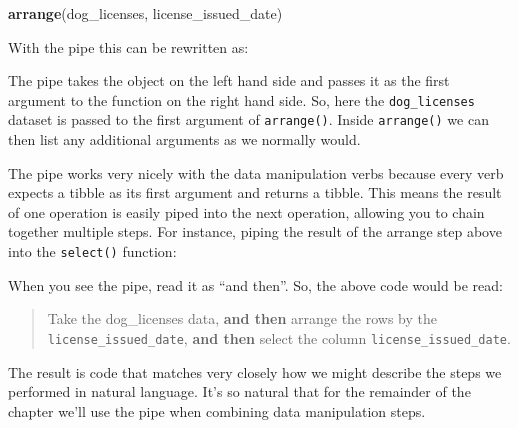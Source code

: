 \documentclass[]{Nemilov}
\newenvironment{Shaded}{\begin{snugshade}}{\end{snugshade}}
\newcommand{\KeywordTok}[1]{\textcolor[rgb]{0.13,0.29,0.53}{\textbf{#1}}}
\newcommand{\NormalTok}[1]{#1}
\newcommand{\OperatorTok}[1]{\textcolor[rgb]{0.81,0.36,0.00}{\textbf{#1}}}
\newcommand{\StringTok}[1]{\textcolor[rgb]{0.31,0.60,0.02}{#1}}
\begin{document}
\begin{Shaded}
\begin{Highlighting}[]
\KeywordTok{arrange}\NormalTok{(dog_licenses, license_issued_date)}
\end{Highlighting}
\end{Shaded}

With the pipe this can be rewritten as:

\begin{Shaded}
\end{Shaded}

The pipe takes the object on the left hand side and passes it as the first argument to the function on the right hand side. So, here the \texttt{dog\_licenses} dataset is passed to the first argument of \texttt{arrange()}. Inside \texttt{arrange()} we can then list any additional arguments as we normally would.

The pipe works very nicely with the data manipulation verbs because every verb expects a tibble as its first argument and returns a tibble. This means the result of one operation is easily piped into the next operation, allowing you to chain together multiple steps. For instance, piping the result of the arrange step above into the \texttt{select()} function:

\begin{Shaded}
\end{Shaded}

When you see the pipe, read it as ``and then''. So, the above code would be read:

\begin{quote}
Take the dog\_licenses data, \textbf{and then}
arrange the rows by the \texttt{license\_issued\_date}, \textbf{and then}
select the column \texttt{license\_issued\_date}.
\end{quote}

The result is code that matches very closely how we might describe the steps we performed in natural language. It's so natural that for the remainder of the chapter we'll use the pipe when combining data manipulation steps.
\end{document}
